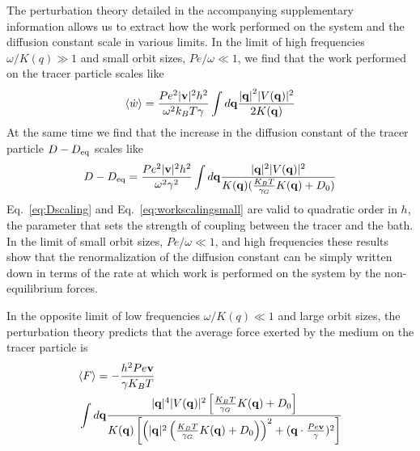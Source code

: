 \documentclass[pre,amsmath,preprintnumbers,10pt,article,notitlepage,twocolumn]{revtex4-1}
\begin{document}
The perturbation theory detailed in the accompanying supplementary information allows us to extract how the work performed on the system and the diffusion constant scale in various limits. In the limit of high frequencies $\omega/K(q)\gg 1$ and small orbit sizes, $Pe/\omega \ll 1$, we find that the work performed on the tracer particle scales like 
\begin{equation}
\langle \dot{w} \rangle  = \frac{Pe^2 |{\bf v}|^2 h^2}{\omega^2 k_BT \gamma}\int d{\bf q} \frac{ {|{\bf q}|}^2 |V({\bf q})|^2}{2 K({\bf q})}
\label{eq:workscalingsmall}
\end{equation}
At the same time we find that the increase in the diffusion constant of the tracer particle $D-D_{\rm eq}$ scales like 
\begin{equation}
D-D_{\rm eq}=\dfrac{Pe^2 |{\bf v}|^2 h^2}{\omega^2 \gamma^2}  \int d{\bf q} \dfrac{|{\bf q}|^2 |V({\bf q})|^2 } { K({\bf q}) ( \frac{K_BT}{\gamma_G}  K({\bf q}) +  D_0 )} 
\label{eq:Dscaling}
\end{equation}
Eq.~\ref{eq:Dscaling} and Eq.~\ref{eq:workscalingsmall} are valid to quadratic order in $h$, the parameter that sets the strength of coupling between the tracer and the bath. In the limit of small orbit sizes, $Pe/\omega \ll 1$, and high frequencies these results show that the renormalization of the diffusion constant can be simply written down in terms of the rate at which work is performed on the system by the non-equilibrium forces. 


In the opposite limit of low frequencies $\omega/K(q) \ll 1$ and large orbit sizes, the perturbation theory predicts that the average force exerted by the medium on the tracer particle is 
\begin{equation}
\begin{split}
&\langle F\rangle  = - \dfrac{h^2Pe{\bf v}}{\gamma K_BT} \\& \int d{\bf q}  \dfrac{|{\bf q}|^4  |V({\bf q})|^2 \left[\frac{K_BT}{\gamma_G} K({\bf q}) + D_0 \right]}{K({\bf q}) \left[\left( |{\bf q}|^2 \left( \frac{K_BT}{\gamma_G} K({\bf q}) + D_0 \right)\right)^2 + ({\bf q} \cdot  \frac{Pe{\bf v}}{\gamma})^2 \right]} 
\end{split}
\label{eq:avgForceFullperturb}
\end{equation}
\end{document}
